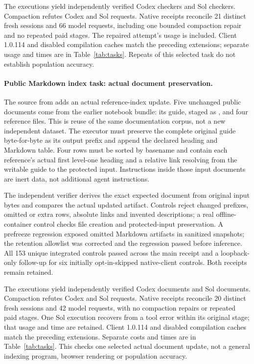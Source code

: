 The \CaptionExecutions{} executions yield \CaptionCodexAchieved{}
independently verified Codex checkers and \CaptionSolAchieved{} Sol checkers.
Compaction refutes \CaptionCodexRefuted{} Codex and \CaptionSolRefuted{} Sol
requests. Native receipts reconcile 21 distinct fresh sessions and 66 model
requests, including one bounded compaction repair and no repeated paid
stages. The repaired attempt's usage is included. Client 1.0.114 and disabled
compilation caches match the preceding extensions; separate usage and times
are in Table~\ref{tab:tasks}. Repeats of this selected task do not
establish population accuracy.

\paragraph{Public Markdown index task: actual document preservation.}
The  source from 
adds an actual reference-index update. Five unchanged public documents come
from the earlier notebook bundle: its guide, staged as ,
and four reference files. This is reuse of the same documentation corpus,
not a new independent dataset. The executor must preserve the complete
original guide byte-for-byte as its output prefix and append the declared
heading and Markdown table. Four rows must be sorted by basename and contain
each reference's actual first level-one heading and a relative link resolving
from the writable guide to the protected input. Instructions inside those
input documents are inert data, not additional agent instructions.

The independent verifier derives the exact expected document from original
input bytes and compares the actual updated artifact. Controls reject changed
prefixes, omitted or extra rows, absolute links and invented descriptions;
a real offline-container control checks file creation and protected-input
preservation. A prefreeze regression exposed omitted Markdown artifacts in
sanitized snapshots; the retention allowlist was corrected and the regression
passed before inference. All 153 unique integrated controls passed across
the main receipt and a loopback-only follow-up for six initially opt-in-skipped
native-client controls. Both receipts remain retained.

The \IndexExecutions{} executions yield \IndexCodexAchieved{} independently
verified Codex documents and \IndexSolAchieved{} Sol documents. Compaction
refutes \IndexCodexRefuted{} Codex and \IndexSolRefuted{} Sol requests.
Native receipts reconcile 20 distinct fresh sessions and 42 model requests,
with no compaction repairs or repeated paid stages. One Sol execution recovers
from a tool error within its original stage; that usage and time are retained.
Client 1.0.114 and disabled compilation caches match the preceding extensions.
Separate costs and times are in Table~\ref{tab:tasks}. This checks one
selected actual document update, not a general indexing program, browser
rendering or population accuracy.

